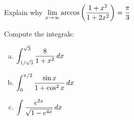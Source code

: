 \documentclass[notes]{subfiles}
\begin{document}
		\begin{ex}
			Explain why $\displaystyle \lim_{x\to\infty} \arccos \left( \dfrac{1+x^2}{1+2x^2}\right) = \dfrac{\pi}{3}$
		\end{ex}
			\newpage
			
		\begin{ex}
			Compute the integrals:
			\begin{enumerate}[(a)]
				\item $\displaystyle \int_{1/\sqrt{3}}^{\sqrt{3}} \dfrac{8}{1+x^2}\, dx$
					
				\item $\displaystyle \int_0^{\pi/2} \dfrac{\sin x}{1+\cos^2x}\, dx$
					
				\item $\displaystyle \int \dfrac{e^{2x}}{\sqrt{1-e^{4x}}}\, dx$
			\end{enumerate}
		\end{ex}
\clearpage
\end{document}
